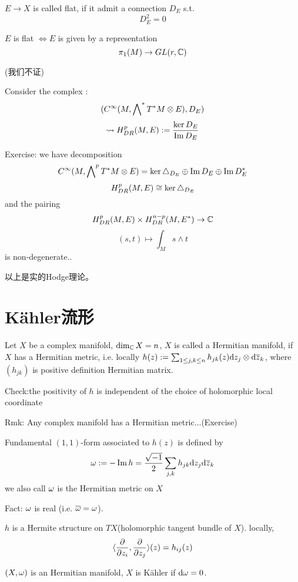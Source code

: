 \begin{definition}
$E\to X$ is called flat, if it admit a connection $D_E$ s.t.
$$D^2_E=0$$
\end{definition}
\begin{rem}
$E$ is flat $\iff E$ is given by a representation
$$\pi_1(M)\to GL(r,\mathbb{C})$$
\end{rem}
(我们不证)

Consider the complex :
$$(C^\infty(M,\bigwedge\nolimits^*T^*M\otimes E),D_E)$$
$$\rightsquigarrow H^p_{DR}(M,E):=\frac{\ker D_E}{\operatorname{Im} D_E}$$

Exercise: we have decomposition
$$C^\infty(M,\bigwedge\nolimits^{p}T^*M\otimes E)=
\ker\triangle_{D_E}\oplus\operatorname{Im} D_E\oplus \operatorname{Im} D_E^*$$
$$H^p_{DR}(M,E)\cong \ker\triangle_{D_E}$$
and the pairing
$$H^p_{DR}(M,E)\times H^{n-p}_{DR}(M,E^*)\to\mathbb{C}$$
$$(s,t)\mapsto \int_M s\wedge t$$
is non-degenerate..

以上是实的Hodge理论。

\section{K\"{a}hler流形}
\begin{definition}
Let $X$ be a complex manifold, $\dim_{\mathbb{C}} X=n$,
$X$ is called a Hermitian manifold, if $X$ has a Hermitian metric,
i.e. locally $h(z):=\sum_{1\leq j,k\leq n}h_{jk}(z)\mathrm{d} z_j\otimes\mathrm{d} \overline{z}_k$,
where $(h_{jk})$ is positive definition Hermitian matrix.
\end{definition}

Check:the positivity of $h$ is independent of the choice of holomorphic local coordinate

Rmk: Any complex manifold has a Hermitian metric...(Exercise)

Fundamental $(1,1)$-form associated to $h(z)$ is defined by
$$\omega:=-\operatorname{Im} h=\frac{\sqrt{-1}}{2}\sum_{j,k}h_{jk}\mathrm{d} z_j\mathrm{d} \overline{z}_k$$
we also call $\omega$ is the Hermitian metric on $X$

Fact: $\omega$ is real (i.e. $\overline{\omega}=\omega$).

\begin{rem}
$h$ is a Hermite structure on $TX$(holomorphic tangent bundle of $X$).
locally,
$$\langle \frac{\partial } {\partial z_i},\frac{\partial } {\partial z_j}\rangle(z)=h_{ij}(z)$$
\end{rem}

\begin{definition}
$(X,\omega)$ is an Hermitian manifold, $X$ is K\"{a}hler if $\mathrm{d}\omega=0$.
\end{definition}

